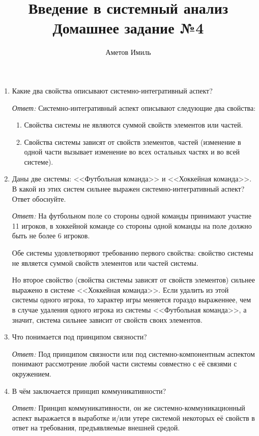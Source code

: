 \documentclass[10pt]{article}
\author{Аметов Имиль}
\title{Введение в системный анализ \\ Домашнее задание №4}
\begin{document}
\maketitle

\begin{enumerate}
\item{Какие два свойства описывают системно-интегративный аспект?}

  \emph{Ответ:} Системно-интегративный аспект описывают следующие два свойства:

  \begin{enumerate}
  \item{Свойства системы не являются суммой свойств элементов или частей.}
  \item{Свойства системы зависят от свойств элементов, частей (изменение в одной части вызывает изменение во всех остальных частях и во всей системе).}
  \end{enumerate}

\item{Даны две системы: <<Футбольная команда>> и <<Хоккейная команда>>. В какой из этих систем сильнее выражен системно-интегративный аспект? Ответ обоснуйте.}

  \emph{Ответ: } На футбольном поле со стороны одной команды принимают участие 11 игроков, в хоккейной команде со стороны одной команды на поле должно быть не более 6 игроков.

  Обе системы удовлетворяют требованию первого свойства: свойство системы не является суммой свойств элементов или частей системы.

  Но второе свойство (свойства системы зависят от свойств элементов) сильнее выражено в системе <<Хоккейная команда>>. Если удалить из этой системы одного игрока, то характер игры меняется гораздо выраженнее, чем в случае удаления одного игрока из системы <<Футбольная команда>>, а значит, система сильнее зависит от свойств своих элементов.

\item{Что понимается под принципом связности?}

  \emph{Ответ: } Под принципом связности или под системно-компонентным аспектом понимают рассмотрение любой части системы совместно с её связями с окружением.

\item{В чём заключается принцип коммуникативности?}

  \emph{Ответ:} Принцип коммуникативности, он же системно-коммуникационный аспект выражается в выработке и/или утере системой некоторых её свойств в ответ на требования, предъявляемые внешней средой.


\end{enumerate}
\end{document}
